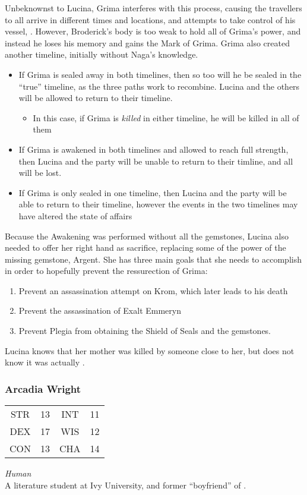 Unbeknownst to Lucina, Grima interferes with this process, causing the travellers to all arrive in different times and locations, and attempts to take control of his vessel, . However, Broderick's body is too weak to hold all of Grima's power, and instead he loses his memory and gains the Mark of Grima. Grima also created another timeline, initially without Naga's knowledge. 
\begin{itemize}
\item If Grima is sealed away in both timelines, then so too will he be sealed in the ``true'' timeline, as the three paths work to recombine. Lucina and the others will be allowed to return to their timeline.
\begin{itemize}
\item In this case, if Grima is \textit{killed} in either timeline, he will be killed in all of them
\end{itemize}
\item If Grima is awakened in both timelines and allowed to reach full strength, then Lucina and the party will be unable to return to their timline, and all will be lost.
\item If Grima is only sealed in one timeline, then Lucina and the party will be able to return to their timeline, however the events in the two timelines may have altered the state of affairs
\end{itemize}

Because the Awakening was performed without all the gemstones, Lucina also needed to offer her right hand as sacrifice, replacing some of the power of the missing gemstone, Argent. She has three main goals that she needs to accomplish in order to hopefully prevent the ressurection of Grima:
\begin{enumerate}
\item Prevent an assassination attempt on Krom, which later leads to his death
\item Prevent the assassination of Exalt Emmeryn
\item Prevent Plegia from obtaining the Shield of Seals and the gemstones.
\end{enumerate}

Lucina knows that her mother was killed by someone close to her, but does not know it was actually .


\subsubsection{Arcadia Wright}
\label{people:phoenix}
\begin{center}
\begin{tabular}{c c|c c}
STR & 13 & INT & 11\\
DEX & 17 & WIS & 12 \\
CON & 13 & CHA & 14 \end{tabular}\end{center}
\textit{Human}\\
A literature student at Ivy University, and former ``boyfriend'' of . 



